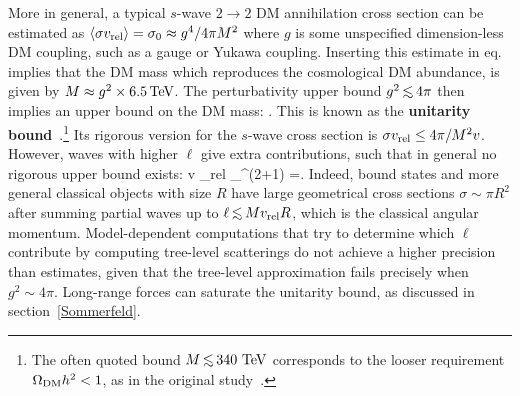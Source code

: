 \medskip

More in general, a typical $s$-wave $2\to 2$ DM annihilation cross section can be estimated as
 $\langle \sigma v_{\rm rel}\rangle = \sigma_0 \approx g^4/4\pi M^2$ where $g$ is some unspecified dimension-less DM coupling,
 such as a gauge or Yukawa coupling.
 Inserting this estimate in eq. implies that the DM mass which reproduces the cosmological DM abundance, is given by
 $M\approx g^2\times 6.5 \,{\rm TeV}$.
The perturbativity upper bound $g^2 \circa{<}4\pi$ then implies an upper bound on the DM mass:
 \beq\label{eq:100TeV}
 .\eeq
This is known as the {\bf unitarity bound}~\cite{unitaritybound}.\footnote{The often quoted bound $M \circa{<}340\, \TeV$ corresponds to the looser requirement $\Omega_{\rm DM} h^2 <1$, as in the original study~\cite{unitaritybound}.}
Its rigorous version for the $s$-wave cross section is 
$\sigma v_{\rm rel} \le 4\pi /M^2 v$.
However, waves with higher $\ell$ give extra contributions, such that in general no rigorous upper bound exists:
\beq 
\label{eq:unitaritybound}
\sigma v _{\rm rel} \le  {}\sum_{}^\infty (2\ell+1) =\infty.\eeq
Indeed, bound states and more general classical objects with size $R$ have large geometrical cross sections $\sigma \sim \pi R^2$
after summing partial waves up to $\ell\circa{<}Mv_{\rm rel} R$, which is the classical angular momentum.
Model-dependent computations that try to determine which $\ell$ contribute by computing
 tree-level scatterings do not achieve a higher precision than estimates, given that the tree-level approximation
fails precisely when $g^2\sim 4\pi$.
Long-range forces can saturate the unitarity bound, as discussed in section~\ref{Sommerfeld}.


\medskip

